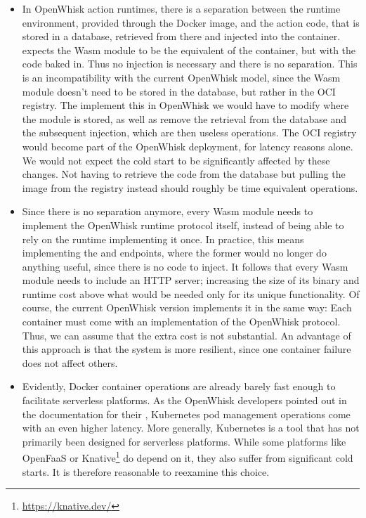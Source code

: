 \begin{itemize}
    \item In OpenWhisk action runtimes, there is a separation between the runtime environment, provided through the Docker image, and the action code, that is stored in a database, retrieved from there and injected into the container.  expects the Wasm module to be the equivalent of the container, but with the code baked in. Thus no injection is necessary and there is no separation. This is an incompatibility with the current OpenWhisk model, since the Wasm module doesn't need to be stored in the database, but rather in the OCI registry. The implement this in OpenWhisk we would have to modify where the module is stored, as well as remove the retrieval from the database and the subsequent injection, which are then useless operations. The OCI registry would become part of the OpenWhisk deployment, for latency reasons alone. We would not expect the cold start to be significantly affected by these changes. Not having to retrieve the code from the database but pulling the image from the registry instead should roughly be time equivalent operations.
    \item Since there is no separation anymore, every Wasm module needs to implement the OpenWhisk runtime protocol itself, instead of being able to rely on the runtime implementing it once. In practice, this means implementing the  and  endpoints, where the former would no longer do anything useful, since there is no code to inject. It follows that every Wasm module needs to include an HTTP server; increasing the size of its binary and runtime cost above what would be needed only for its unique functionality. Of course, the current OpenWhisk version implements it in the same way: Each container must come with an implementation of the OpenWhisk protocol. Thus, we can assume that the extra cost is not substantial. An advantage of this approach is that the system is more resilient, since one container failure does not affect others.
    \item Evidently, Docker container operations are already barely fast enough to facilitate serverless platforms. As the OpenWhisk developers pointed out in the documentation for their , Kubernetes pod management operations come with an even higher latency. More generally, Kubernetes is a tool that has not primarily been designed for serverless platforms. While some platforms like OpenFaaS or Knative\footnote{\url{https://knative.dev/}}  do depend on it, they also suffer from significant cold starts. It is therefore reasonable to reexamine this choice.

\end{itemize}
